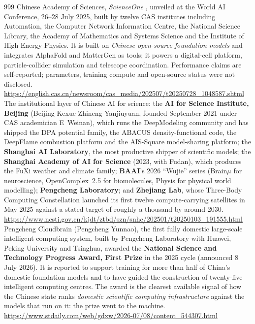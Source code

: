 \begin{thebibliography}{999}
 Chinese Academy of Sciences, \emph{ScienceOne} , unveiled at the World AI Conference, 26--28 July 2025, built by twelve CAS institutes including Automation, the Computer Network Information Centre, the National Science Library, the Academy of Mathematics and Systems Science and the Institute of High Energy Physics. It is built on \emph{Chinese open-source foundation models} and integrates AlphaFold and MatterGen as tools; it powers a digital-cell platform, particle-collider simulation and telescope coordination. Performance claims are self-reported; parameters, training compute and open-source status were not disclosed. \url{https://english.cas.cn/newsroom/cas_media/202507/t20250728_1048587.shtml}
 The institutional layer of Chinese AI for science: the \textbf{AI for Science Institute, Beijing} (Beijing Kexue Zhineng Yanjiuyuan, founded September 2021 under CAS academician E~Weinan), which runs the DeepModeling community and has shipped the DPA potential family, the ABACUS density-functional code, the DeepFlame combustion platform and the AIS-Square model-sharing platform; the \textbf{Shanghai AI Laboratory}, the most productive shipper of scientific models; the \textbf{Shanghai Academy of AI for Science} (2023, with Fudan), which produces the FuXi weather and climate family; \textbf{BAAI}'s 2026 ``Wujie'' series (Brain$\mu$ for neuroscience, OpenComplex~2.5 for biomolecules, Physis for physical world modelling); \textbf{Pengcheng Laboratory}; and \textbf{Zhejiang Lab}, whose Three-Body Computing Constellation launched its first twelve compute-carrying satellites in May 2025 against a stated target of roughly a thousand by around 2030. \url{https://www.ncsti.gov.cn/kjdt/ztbd/szn/snhc/202501/t20250103_191555.html}
 Pengcheng Cloudbrain (Pengcheng Yunnao), the first fully domestic large-scale intelligent computing system, built by Pengcheng Laboratory with Huawei, Peking University and Tsinghua, awarded the \textbf{National Science and Technology Progress Award, First Prize} in the 2025 cycle (announced 8 July 2026). It is reported to support training for more than half of China's domestic foundation models and to have guided the construction of twenty-five intelligent computing centres. The award is the clearest available signal of how the Chinese state ranks \emph{domestic scientific computing infrastructure} against the models that run on it: the prize went to the machine. \url{https://www.stdaily.com/web/gdxw/2026-07/08/content_544307.html}

\end{thebibliography}

